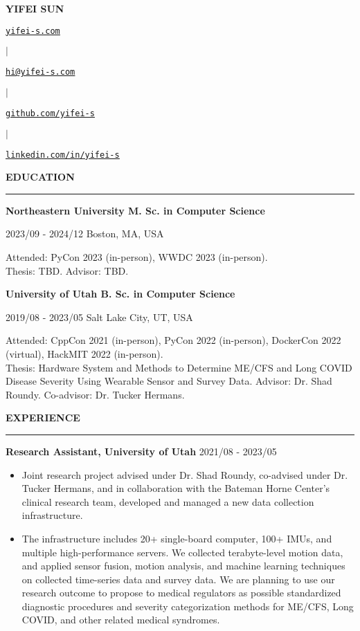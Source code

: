 \documentclass{letter}
\newcommand{\link}[2]{
\href{#1}{\underline{\texttt{#2}}}
}
\newcommand{\section}[1]{
\Large{\textbf{\MakeUppercase{#1}}}

\vspace{-0.3in}
\rule{\textwidth}{0.25mm}
\vspace{-0.35in}
}
\newcommand{\education}[5]{
\large{\textbf{#1 \hfill #2}}

\vspace{-1.5mm}

\normalsize{#3 \hfill #4}

\vspace{-1.5mm}

\normalsize{#5}
}
\newcommand{\experience}[3]{
\large{\textbf{#1} \hfill \normalsize{#2}}

\vspace{-2.5mm}

\normalsize{#3}

\vspace{-2.5mm}
}
\begin{document}
\begin{center}
\huge{\textbf{\MakeUppercase{Yifei Sun}}} 

\normalsize{
\link{https://yifei.md}{yifei-s.com}
\hspace{1mm}$\mid$\hspace{1mm}
\link{mailto:yifei@email.com}{hi@yifei-s.com}
\hspace{1mm}$\mid$\hspace{1mm}
\link{https://github.com/stepbrobd}{github.com/yifei-s}
\hspace{1mm}$\mid$\hspace{1mm}
\link{https://www.linkedin.com/in/yifei-s}{linkedin.com/in/yifei-s}
}
\end{center}

\section{Education}

\education{Northeastern University}
{M. Sc. in Computer Science}
{2023/09 - 2024/12}
{Boston, MA, USA} {
Attended: PyCon 2023 (in-person), WWDC 2023 (in-person).\\
Thesis: TBD. Advisor: TBD.
}

\education{University of Utah}
{B. Sc. in Computer Science}
{2019/08 - 2023/05}
{Salt Lake City, UT, USA} {
Attended: CppCon 2021 (in-person), PyCon 2022 (in-person), DockerCon 2022 (virtual), HackMIT 2022 (in-person).\\
Thesis: Hardware System and Methods to Determine ME/CFS and Long COVID Disease Severity Using Wearable Sensor and Survey Data. Advisor: Dr. Shad Roundy. Co-advisor: Dr. Tucker Hermans.
}

\section{Experience}

\experience{Research Assistant, University of Utah}{2021/08 - 2023/05} {
\begin{itemize}
\item Joint research project advised under Dr. Shad Roundy, co-advised under Dr. Tucker Hermans, and in collaboration with the Bateman Horne Center's clinical research team, developed and managed a new data collection infrastructure.
\item The infrastructure includes 20+ single-board computer, 100+ IMUs, and multiple high-performance servers. We collected terabyte-level motion data, and applied sensor fusion, motion analysis, and machine learning techniques on collected time-series data and survey data. We are planning to use our research outcome to propose to medical regulators as possible standardized diagnostic procedures and severity categorization methods for ME/CFS, Long COVID, and other related medical syndromes.
\end{itemize}
}
\end{document}
